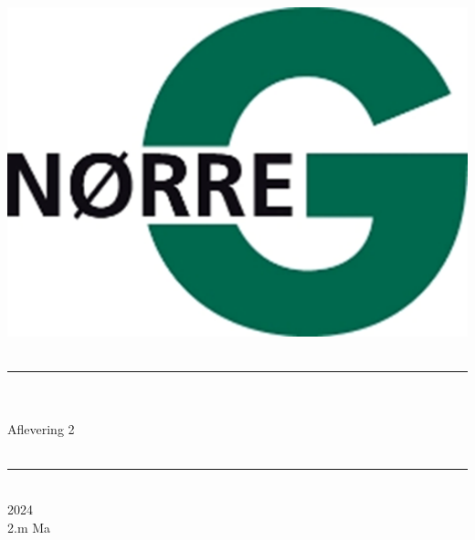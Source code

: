 \documentclass[12pt,x11names,a4paper]{article}
\begin{document}
%

\begin{titlepage}

\begin{minipage}{0.27\textwidth}

\end{minipage}
\begin{minipage}{0.73\textwidth}
\begin{center}
\phantom{h} \vspace{1cm}\\
\hspace{4cm}
\includegraphics[scale = 1]{Billeder/Norreg.png} \\
\phantom{h} \vspace{5cm}\\
\rule{0.7\textwidth}{0.3mm}\\
\phantom{h}\\
{\fontsize{50}{60}\selectfont Aflevering 2}\\
\phantom{h}\\
\rule{0.7\textwidth}{0.3mm}\\
\Large 2024\\
\Large 2.m Ma

\end{center}
\end{minipage}
\end{titlepage}
\end{document}
